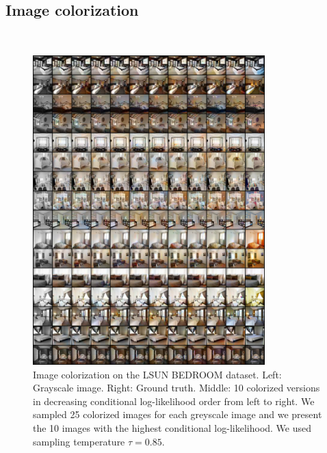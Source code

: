 \subsection{Image colorization}\ 
\begin{figure}[h!]
    \centering
    \includegraphics[width=0.8\textwidth]{Chapter1/paper_graphs/SupplementaryMaterial/colorisation_lsun_0.85.png}
    \caption{Image colorization on the LSUN BEDROOM dataset. Left: Grayscale image. Right: Ground truth. Middle: 10 colorized versions in decreasing conditional log-likelihood order from left to right. We sampled 25 colorized images for each greyscale image and we present the 10 images with the highest conditional log-likelihood. We used sampling temperature $\tau=0.85$.}
\end{figure}

